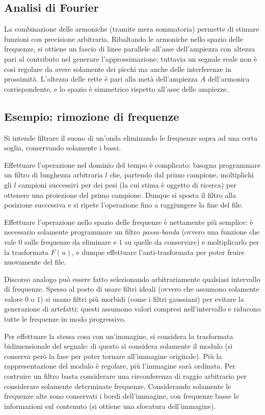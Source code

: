 \documentclass[11pt, a4page]{article}
\begin{document}
\subsection{Analisi di Fourier}
La combinazione delle armoniche (tramite mera sommatoria) permette di stimare funzioni con precisione arbitraria.
Ribaltando le armoniche nello spazio delle frequenze, si ottiene un fascio di linee parallele all'asse dell'ampiezza con altezza pari al contributo nel generare l'approssimazione; tuttavia un segnale reale non è così regolare da avere solamente dei picchi ma anche delle interferenze in prossimità.
L'altezza delle rette è pari alla metà dell'ampiezza $A$ dell'armonica corrispondente, e lo spazio è simmetrico rispetto all'asse delle ampiezze.

\subsection{Esempio: rimozione di frequenze}
Si intende filtrare il suono di un'onda eliminando le frequenze sopra ad una certa soglia, conservando solamente i bassi.

Effettuare l'operazione nel dominio del tempo è complicato: bisogna programmare un filtro di lunghezza arbitraria $l$ che, partendo dal primo campione, moltiplichi gli $l$ campioni successivi per dei pesi (la cui stima è oggetto di ricerca) per ottenere una proiezione del primo campione.
Dunque si sposta il filtro alla posizione successiva e si ripete l'operazione fino a raggiungere la fine del file.

Effettuare l'operazione nello spazio delle frequenze è nettamente più semplice: è necessario solamente programmare un filtro \textit{passa-banda} (ovvero una funzione che vale $0$ sulle frequenze da eliminare e $1$ su quelle da conservare) e moltiplicarlo per la trasformata $F(u)$, e dunque effettuare l'anti-trasformata per poter fruire nuovamente del file.

Discorso analogo può essere fatto selezionando arbitrariamente qualsiasi intervallo di frequenze.
Spesso al posto di usare filtri ideali (ovvero che assumono solamente valore $0$ o $1$) si usano filtri più morbidi (come i filtri gaussiani) per evitare la generazione di artefatti: questi assumono valori compresi nell'intervallo e riducono tutte le frequenze in modo progressivo. \newline

Per effettuare la stessa cosa con un'immagine, si considera la trasformata bidimensionale del segnale: di questo si considera solamente il modulo (si conserva però la fase per poter tornare all'immagine originale).
Più la rappresentazione del modulo è regolare, più l'immagine sarà ordinata.
Per costruire un filtro basta considerare una circonferenza di raggio arbitrario per considerare solamente determinate frequenze.
Considerando solamente le frequenze alte sono conservati i bordi dell'immagine, con frequenze basse le informazioni sul contenuto (si ottiene una sfocatura dell'immagine).
\end{document}
